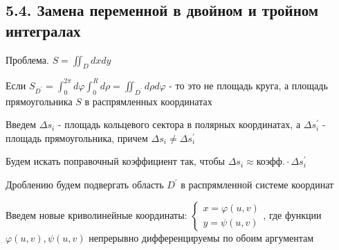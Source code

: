 \documentclass[12pt]{article}
\begin{document}
    \subsection{5.4. Замена переменной в двойном и тройном интегралах}

    \hypertarget{substitutionindoubleintegral}{}

    Проблема. $S = \iint_D dxdy$

    Если $S_{D^\prime} = \int_0^{2\pi} d\varphi \int_0^R d\rho = \iint_{D^\prime} d\rho d\varphi$ - то это не площадь круга, а площадь прямоугольника $S$ в распрямленных координатах

    Введем $\Delta s_i$ - площадь кольцевого сектора в полярных координатах, а $\Delta s^\prime_i$ - площадь прямоугольника, причем $\Delta s_i \neq \Delta s_i^\prime$

    \Nota Будем искать поправочный коэффициент так, чтобы $\Delta s_i \approx \text{коэфф.} \cdot \Delta s_i^\prime$

    Дроблению будем подвергать область $D^\prime$ в распрямленной системе координат

    Введем новые криволинейные координаты: $\begin{cases}
                                                x = \varphi(u, v) \\ y = \psi(u, v)
    \end{cases}$,
    где функции $\varphi(u, v), \psi(u, v)$ непрерывно дифференцируемы по обоим аргументам
\end{document}
